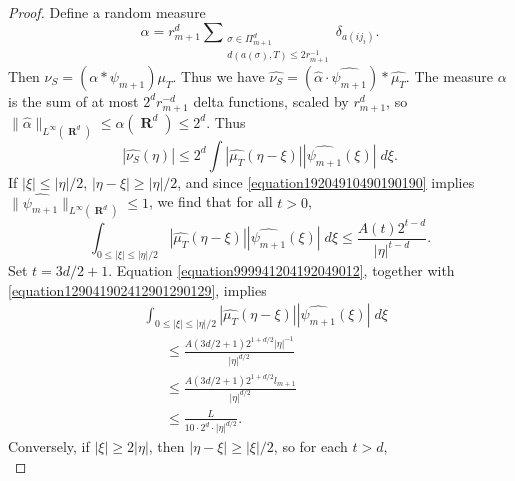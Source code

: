 \documentclass[12pt,reqno]{article}
\numberwithin{equation}{section}
\DeclareMathOperator{\RR}{\mathbf{R}}
\begin{document}
\begin{proof}
    Define a random measure
    \[ \alpha = r_{m+1}^d \sum\nolimits_{\substack{\sigma \in \Pi_{m+1}^d\\d(a(\sigma),T) \leq 2 r_{m+1}^{-1}}} \delta_{a(ij_i)}. \]
    Then $\nu_S = (\alpha * \psi_{m+1}) \mu_T$.
    Thus we have $\widehat{\nu_S} = (\widehat{\alpha} \cdot \widehat{\psi_{m+1}}) * \widehat{\mu_T}$. The measure $\alpha$ is the sum of at most $2^d r_{m+1}^{-d}$ delta functions, scaled by $r_{m+1}^d$, so $\| \widehat{\alpha} \|_{L^\infty(\RR^d)} \leq \alpha(\RR^d) \leq 2^d$. Thus
    \begin{equation} \label{equation9942941924912912}
        |\widehat{\nu_S}(\eta)| \leq 2^d \int |\widehat{\mu_T}(\eta - \xi)| |\widehat{\psi_{m+1}}(\xi)|\; d\xi.
    \end{equation}
    If $|\xi| \leq |\eta|/2$, $|\eta - \xi| \geq |\eta|/2$, and since \eqref{equation19204910490190190} implies $\| \widehat{\psi_{m+1}} \|_{L^\infty(\RR^d)} \leq 1$, we find that for all $t > 0$,
    \begin{equation} \label{equation999941204192049012}
        \int_{0 \leq |\xi| \leq |\eta|/2} |\widehat{\mu_T}(\eta - \xi)| |\widehat{\psi_{m+1}}(\xi)|\; d\xi \leq \frac{A(t) 2^{t-d}}{|\eta|^{t-d}}.
    \end{equation}
    Set $t = 3d/2 + 1$. Equation \eqref{equation999941204192049012}, together with \eqref{equation129041902412901290129}, implies
    \begin{equation} \label{equation1111902491209012}
    \begin{split}
        &\int_{0 \leq |\xi| \leq |\eta|/2} |\widehat{\mu_T}(\eta - \xi)| |\widehat{\psi_{m+1}}(\xi)|\; d\xi\\
        &\ \ \ \ \ \ \ \leq \frac{A(3d/2 + 1) 2^{1 + d/2} |\eta|^{-1}}{|\eta|^{d/2}}\\
        &\ \ \ \ \ \ \ \leq \frac{A(3d/2 + 1) 2^{1 + d/2} l_{m+1}}{|\eta|^{d/2}}\\
        &\ \ \ \ \ \ \ \leq \frac{L}{10 \cdot 2^d \cdot |\eta|^{d/2}}.
    \end{split}
    \end{equation}
    Conversely, if $|\xi| \geq 2|\eta|$, then $|\eta - \xi| \geq |\xi|/2$, so for each $t > d$,
    \begin{equation} \label{equation5551092491022109}

\end{equation}
\end{proof}
\end{document}
